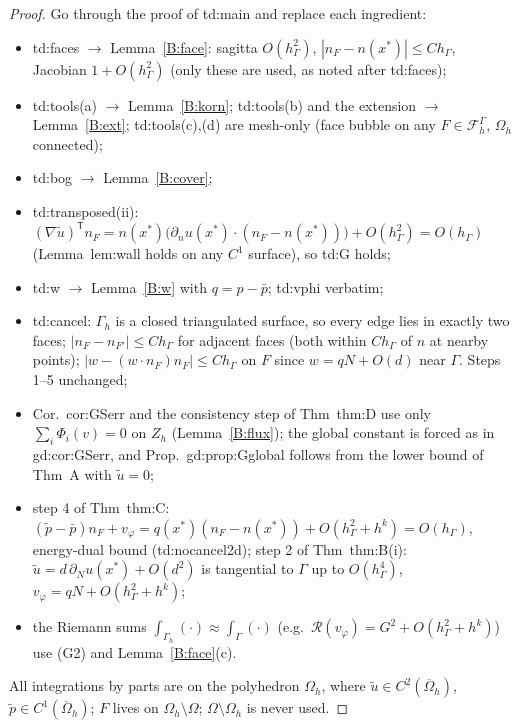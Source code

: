 \documentclass[11pt]{article}
\theoremstyle{definition}
\newcommand{\hG}{h_\Gamma}
\newcommand{\Gh}{\Gamma_h}
\newcommand{\Oh}{\Omega_h}
\newcommand{\FG}{\mathcal F_h^\Gamma}
\newcommand{\Zh}{Z_h}
\newcommand{\dn}{\partial_n}
\newcommand{\ut}{\tilde u}
\newcommand{\pt}{\tilde p}
\newcommand{\pbar}{\bar p}
\newcommand{\Rc}{\mathcal R}
\begin{document}
\begin{proof}
Go through the proof of td:main and replace each ingredient:
\begin{itemize}
\item td:faces $\to$ Lemma~\ref{B:face}: sagitta $O(\hG^2)$, $|n_F-n(x^\ast)|\le C\hG$, Jacobian $1+O(\hG^2)$ (only these are used, as noted after td:faces);
\item td:tools(a) $\to$ Lemma~\ref{B:korn}; td:tools(b) and the extension $\to$ Lemma~\ref{B:ext}; td:tools(c),(d) are mesh-only (face bubble on any $F\in\FG$, $\Oh$ connected);
\item td:bog $\to$ Lemma~\ref{B:cover};
\item td:transposed(ii): $(\nabla\ut)^{\mathsf T}n_F=n(x^\ast)\bigl(\dn u(x^\ast)\cdot(n_F-n(x^\ast))\bigr)+O(\hG^2)=O(\hG)$ (Lemma~lem:wall holds on any $C^1$ surface), so td:G holds;
\item td:w $\to$ Lemma~\ref{B:w} with $q=p-\pbar$; td:vphi verbatim;
\item td:cancel: $\Gh$ is a closed triangulated surface, so every edge lies in exactly two faces; $|n_F-n_{F'}|\le C\hG$ for adjacent faces (both within $C\hG$ of $n$ at nearby points); $|w-(w\cdot n_F)n_F|\le C\hG$ on $F$ since $w=qN+O(d)$ near $\Gamma$. Steps 1--5 unchanged;
\item Cor.~cor:GSerr and the consistency step of Thm~thm:D use only $\sum_i\Phi_i(v)=0$ on $\Zh$ (Lemma~\ref{B:flux}); the global constant is forced as in gd:cor:GSerr, and Prop.~gd:prop:Gglobal follows from the lower bound of Thm~A with $\ut=0$;
\item step 4 of Thm~thm:C: $(\pt-\pbar)n_F+v_\varphi=q(x^\ast)(n_F-n(x^\ast))+O(\hG^2+h^k)=O(\hG)$, energy-dual bound (td:nocancel2d); step 2 of Thm~thm:B(i): $\ut=d\,\partial_Nu(x^\ast)+O(d^2)$ is tangential to $\Gamma$ up to $O(\hG^4)$, $v_\varphi=qN+O(\hG^2+h^k)$;
\item the Riemann sums $\int_{\Gh}(\cdot)\approx\int_\Gamma(\cdot)$ (e.g.\ $\Rc(v_\varphi)=G^2+O(\hG^2+h^k)$) use (G2) and Lemma~\ref{B:face}(c).
\end{itemize}
All integrations by parts are on the polyhedron $\Oh$, where $\ut\in C^2(\overline\Oh)$, $\pt\in C^1(\overline\Oh)$; $F$ lives on $\Oh\setminus\Omega$; $\Omega\setminus\Oh$ is never used.
\end{proof}
\end{document}
